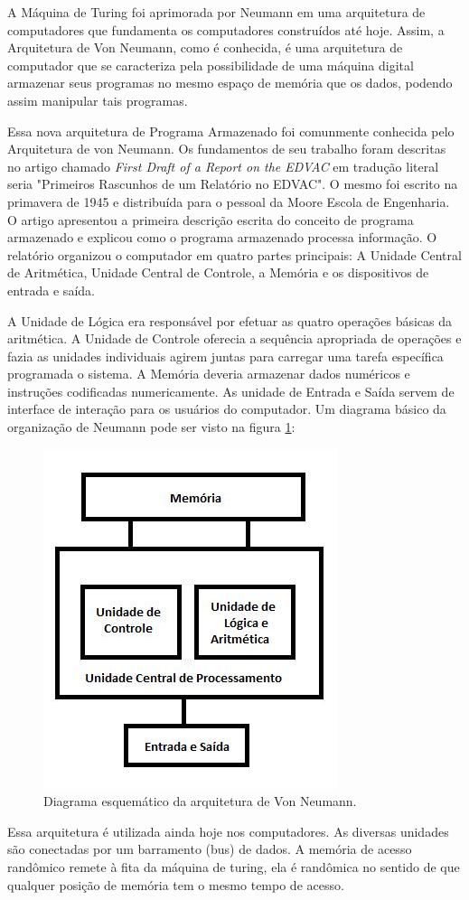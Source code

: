 \documentclass[12pt]{article}
\begin{document}
A Máquina de Turing foi aprimorada por Neumann em uma arquitetura de computadores que fundamenta os computadores construídos até hoje. Assim, a Arquitetura de Von Neumann, como é conhecida, é uma arquitetura de computador que se caracteriza pela possibilidade de uma máquina digital armazenar seus programas no mesmo espaço de memória que os dados, podendo assim manipular tais programas.

Essa nova arquitetura de Programa Armazenado foi comunmente conhecida pelo Arquitetura de von Neumann. Os fundamentos de seu trabalho foram descritas no artigo chamado \emph{First Draft of a Report on the EDVAC} em tradução literal seria "Primeiros Rascunhos de um Relatório no EDVAC". O mesmo foi escrito na primavera de 1945 e distribuída para o pessoal da Moore Escola de Engenharia. O artigo apresentou a primeira descrição escrita do conceito de programa armazenado e explicou como o programa armazenado processa informação.
O relatório organizou o computador em quatro partes principais: A Unidade Central de Aritmética, Unidade Central de Controle, a Memória e os dispositivos de entrada e saída.

A Unidade de Lógica era responsável por efetuar as quatro operações básicas da aritmética. A Unidade de Controle oferecia a sequência apropriada de operações e fazia as unidades individuais agirem juntas para carregar uma tarefa específica programada o sistema. A Memória deveria armazenar dados numéricos e instruções codificadas numericamente. As unidade de Entrada e Saída servem de interface de interação para os usuários do computador.
Um diagrama básico da organização de Neumann pode ser visto na figura \ref{fig:exampleFig2}:


\begin{figure}[!ht]
\centering
\includegraphics[width=.3\textwidth]{fig2.jpg}
\caption{Diagrama esquemático da arquitetura de Von Neumann.}
\label{fig:exampleFig2}
\end{figure}

Essa arquitetura é utilizada ainda hoje nos computadores. As diversas unidades são conectadas por um barramento (bus) de dados. A memória de acesso randômico remete à fita da máquina de turing, ela é randômica no sentido de que qualquer posição de memória tem o mesmo tempo de acesso.
\end{document}
